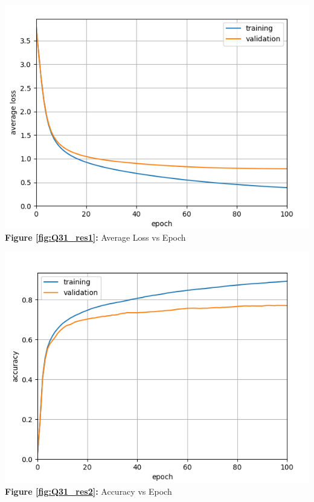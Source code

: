 \documentclass{article}
\begin{document}
	\begin{minipage}{0.48\linewidth}
		\centering
		\includegraphics[width=\linewidth]{./Q31_res_loss.png}
		\textbf{Figure \ref{fig:Q31_res1}:} Average Loss vs Epoch %
		\label{fig:Q31_res1}         %
	\end{minipage}
	\hfill
	\begin{minipage}{0.48\linewidth}
		\centering
		\includegraphics[width=\linewidth]{./Q31_res_acc.png}
		\textbf{Figure \ref{fig:Q31_res2}:} Accuracy vs Epoch  %
		\label{fig:Q31_res2}         %
	\end{minipage}		
	
\end{document}
